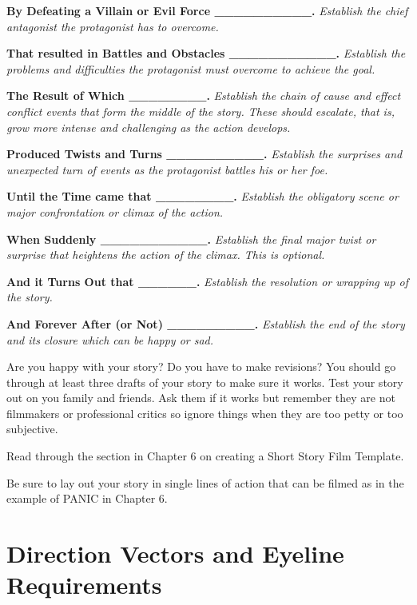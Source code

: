 \documentclass[
]{book}
\begin{document}
\begin{reflect}
\textbf{By Defeating a Villain or Evil Force \_\_\_\_\_\_\_\_\_\_.}
\emph{Establish the chief antagonist the protagonist has to overcome.}

\textbf{That resulted in Battles and Obstacles \_\_\_\_\_\_\_\_\_\_\_.}
\emph{Establish the problems and difficulties the protagonist must overcome to achieve the goal.}

\textbf{The Result of Which \_\_\_\_\_\_\_\_.}
\emph{Establish the chain of cause and effect conflict events that form the middle of the story. These should escalate, that is, grow more intense and challenging as the action develops.}

\textbf{Produced Twists and Turns \_\_\_\_\_\_\_\_\_\_.}
\emph{Establish the surprises and unexpected turn of events as the protagonist battles his or her foe.}

\textbf{Until the Time came that \_\_\_\_\_\_\_\_.}
\emph{Establish the obligatory scene or major confrontation or climax of the action.}

\textbf{When Suddenly \_\_\_\_\_\_\_\_\_\_\_.}
\emph{Establish the final major twist or surprise that heightens the action of the climax. This is optional.}

\textbf{And it Turns Out that \_\_\_\_\_\_.}
\emph{Establish the resolution or wrapping up of the story.}

\textbf{And Forever After (or Not) \_\_\_\_\_\_\_\_\_.}
\emph{Establish the end of the story and its closure which can be happy or sad.}

Are you happy with your story? Do you have to make revisions? You should go through at least three drafts of your story to make sure it works. Test your story out on you family and friends. Ask them if it works but remember they are not filmmakers or professional critics so ignore things when they are too petty or too subjective.

Read through the section in Chapter 6 on creating a Short Story Film Template.

Be sure to lay out your story in single lines of action that can be filmed as in the example of PANIC in Chapter 6.
\end{reflect}

\hypertarget{direction-vectors-and-eyeline-requirements}{%
\section{Direction Vectors and Eyeline Requirements}\label{direction-vectors-and-eyeline-requirements}}
\end{document}
